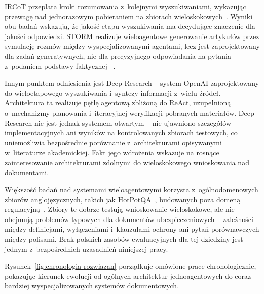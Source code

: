 IRCoT przeplata kroki rozumowania z~kolejnymi wyszukiwaniami, wykazując
przewagę nad jednorazowym pobieraniem na zbiorach
wieloskokowych~\cite{trivedi2023interleaving}. Wyniki obu badań wskazują, że
jakość etapu wyszukiwania ma decydujące znaczenie dla jakości odpowiedzi. STORM
realizuje wieloagentowe generowanie artykułów przez symulację rozmów między
wyspecjalizowanymi agentami, lecz jest zaprojektowany dla zadań generatywnych,
nie dla precyzyjnego odpowiadania na pytania z~podaniem podstawy faktycznej
~\cite{shao2024assisting}.

Innym punktem odniesienia jest Deep Research -- system OpenAI zaprojektowany do
wieloetapowego wyszukiwania i~syntezy informacji z~wielu źródeł. Architektura
ta realizuje pętlę agentową zbliżoną do ReAct, uzupełnioną o~mechanizmy
planowania i~iteracyjnej weryfikacji pobranych materiałów. Deep Research nie
jest jednak systemem otwartym -- nie ujawniono szczegółów implementacyjnych ani
wyników na kontrolowanych zbiorach testowych, co uniemożliwia bezpośrednie
porównanie z~architekturami opisywanymi w~literaturze akademickiej. Fakt jego
wdrożenia wskazuje na rosnące zainteresowanie architekturami zdolnymi do
wieloskokowego wnioskowania nad dokumentami.

Większość badań nad systemami wieloagentowymi korzysta z~ogólnodomenowych
zbiorów anglojęzycznych, takich jak HotPotQA~\cite{yang2018hotpotqa},
budowanych poza domeną regulacyjną~\cite{ho2020constructing}. Zbiory te dobrze
testują wnioskowanie wieloskokowe, ale nie obejmują problemów typowych dla
dokumentów ubezpieczeniowych -- zależności między definicjami, wyłączeniami
i~klauzulami ochrony ani pytań porównawczych między polisami. Brak polskich
zasobów ewaluacyjnych dla tej dziedziny jest jednym z~bezpośrednich uzasadnień
niniejszej pracy.

Rysunek~\ref{fig:chronologia-rozwiazan} porządkuje omówione prace
chronologicznie, pokazując kierunek ewolucji od ogólnych architektur
jednoagentowych do coraz bardziej wyspecjalizowanych systemów dokumentowych.

